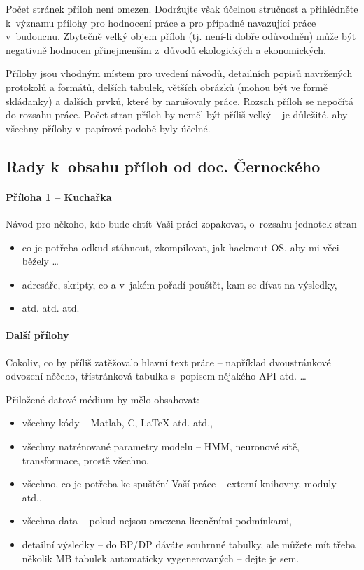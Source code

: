 Počet stránek příloh není omezen. Dodržujte však účelnou stručnost a přihlédněte k~významu přílohy pro hodnocení práce a pro případné navazující práce v~budoucnu. Zbytečně velký objem příloh (tj. není-li dobře odůvodněn) může být negativně hodnocen přinejmenším z~důvodů ekologických a ekonomických. \cite{fitWeb}

Přílohy jsou vhodným místem pro uvedení návodů, detailních popisů navržených protokolů a formátů, delších tabulek, větších obrázků (mohou být ve formě skládanky) a dalších prvků, které by narušovaly  práce. Rozsah příloh se nepočítá do rozsahu práce. Počet stran příloh by neměl být příliš velký -- je důležité, aby všechny přílohy v~papírové podobě byly účelné.

\subsection*{Rady k~obsahu příloh od doc. Černockého}   

\paragraph{Příloha 1 -- Kuchařka}

Návod pro někoho, kdo bude chtít Vaši práci zopakovat, o~rozsahu jednotek stran
\begin{itemize}
  \item{co je potřeba odkud stáhnout, zkompilovat, jak hacknout OS, aby mi věci běžely \ldots}
  \item{adresáře, skripty, co a v~jakém pořadí pouštět, kam se dívat na výsledky,}
  \item{atd. atd. atd.}
\end{itemize}

\paragraph{Další přílohy}

Cokoliv, co by příliš zatěžovalo hlavní text práce -- například dvoustránkové odvození něčeho, třístránková tabulka s~popisem nějakého API atd. \ldots

Přiložené datové médium by mělo obsahovat:
\begin{itemize}
  \item{všechny kódy -- Matlab, C, \LaTeX{} atd. atd.,}
  \item{všechny natrénované parametry modelu -- HMM, neuronové sítě, transformace, prostě všechno,}
  \item{všechno, co je potřeba ke spuštění Vaší práce -- externí knihovny, moduly atd.,}
  \item{všechna data -- pokud nejsou omezena licenčními podmínkami,}
  \item{detailní výsledky -- do BP/DP dáváte souhrnné tabulky, ale můžete mít třeba několik MB tabulek automaticky vygenerovaných -- dejte je sem.}
\end{itemize}


